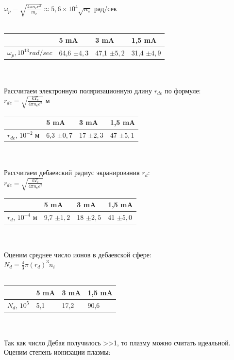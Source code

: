 \documentclass[11pt]{article}
\begin{document}
$ \omega_{p} = \sqrt{\frac{4\pi n_{e}e^2}{m_{e}}} \approx 5,6 \times 10^4 \sqrt{n_{e}} $ рад/сек\\
\\
\begin{tabular}{|l|l|l|l|}
\hline
 & 5 mA & 3 mA & 1,5 mA\\
\hline
$\omega_{p}, 10^{13} rad/sec$ & 64,6 $\pm 4,3$ & 47,1 $\pm 5,2$ & 31,4 $\pm 4,9$
\\
\hline
\end{tabular}
\\
\\
Рассчитаем электронную поляризационную длину $r_{de}$ по формуле:\\
$ r_{de} = \sqrt{\frac{kT_{e}}{4\pi n_{e}e^2}}$ м\\
\begin{tabular}{|l|l|l|l|}
\hline
 & 5 mA & 3 mA & 1,5 mA\\
\hline
$ r_{de} $, $10^{-2}$ м & 6,3 $ \pm 0,7$ & 17 $\pm 2,3$ & 47 $\pm 5,1$
\\
\hline
\end{tabular}
\\
\\
Рассчитаем дебаевский радиус экранирования $r_{d}$:\\
$ r_{de} = \sqrt{\frac{kT_{i}}{4\pi n_{e}e^2}}$\\
\begin{tabular}{|l|l|l|l|}
\hline
 & 5 mA & 3 mA & 1,5 mA\\
\hline
$ r_{d} $, $10^{-4}$ м & 9,7 $\pm 1,2$ & 18 $\pm 2,5$ & 41 $\pm 5,0$
\\
\hline
\end{tabular}
\\
\\
Оценим среднее число ионов в дебаевской сфере:\\
$ N_{d} = \frac{4}{3}\pi (r_{d})^3n_{i}$\\
\\
\begin{tabular}{|l|l|l|l|}
\hline
 & 5 mA & 3 mA & 1,5 mA\\
\hline
$ N_{d} $, $10^{5}$  & 5,1 & 17,2 & 90,6
\\
\hline
\end{tabular}
\\
\\
Так как число Дебая получилось >>1, то плазму можно считать идеальной.\\
Оценим степень ионизации плазмы:\\
\\
\end{document}
